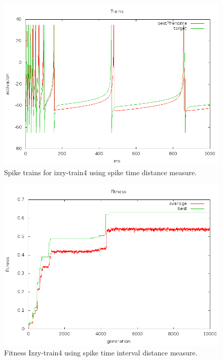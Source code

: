 \documentclass[a4paper]{article}
\begin{document}
\begin{figure}[htb!]
  \centering
  \includegraphics[width=\textwidth]{SpikeTime-izzy4-trains-plot.png}
  \caption{Spike trains for izzy-train4 using spike time distance measure.}
\end{figure}

\newpage

\begin{figure}[htb!]
  \centering
  \includegraphics[width=\textwidth]{SpikeInterval-izzy4-fitness-plot.png}
  \caption{Fitness Izzy-train4 using spike time interval distance measure.}
\end{figure}
\end{document}
